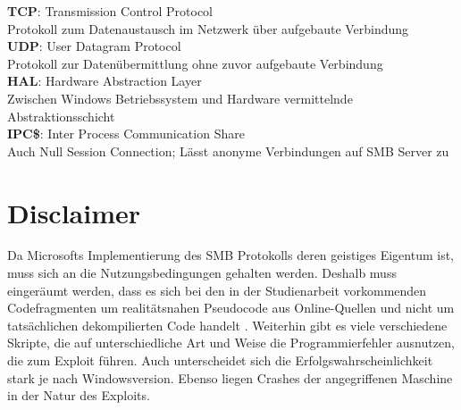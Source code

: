 \documentclass[DIV=12,headings=normal,pdftex,headinclude=false,footinclude=false,final]{scrreprt}
\begin{document}
\noindent
\textbf{TCP}: Transmission Control Protocol\\
Protokoll zum Datenaustausch im Netzwerk über aufgebaute Verbindung\\

\noindent
\textbf{UDP}: User Datagram Protocol\\
Protokoll zur Datenübermittlung ohne zuvor aufgebaute Verbindung\\

\noindent
\textbf{HAL}: Hardware Abstraction Layer\\
Zwischen Windows Betriebssystem und Hardware vermittelnde Abstraktionsschicht\\

\noindent
\textbf{IPC\$}: Inter Process Communication Share\\
Auch Null Session Connection; Lässt anonyme Verbindungen auf SMB Server zu\\

\newpage
{}


\chapter{Disclaimer}
Da Microsofts Implementierung des SMB Protokolls deren geistiges Eigentum ist, muss sich an die Nutzungsbedingungen gehalten werden. Deshalb muss eingeräumt werden, dass es sich bei den in der Studienarbeit vorkommenden Codefragmenten um realitätsnahen Pseudocode aus Online-Quellen und nicht um tatsächlichen dekompilierten Code handelt \cite{MS:LicTerm}. Weiterhin gibt es viele verschiedene Skripte, die auf unterschiedliche Art und Weise die Programmierfehler ausnutzen, die zum Exploit führen. Auch unterscheidet sich die Erfolgswahrscheinlichkeit stark je nach Windowsversion. Ebenso liegen Crashes der angegriffenen Maschine in der Natur des Exploits.
\end{document}
